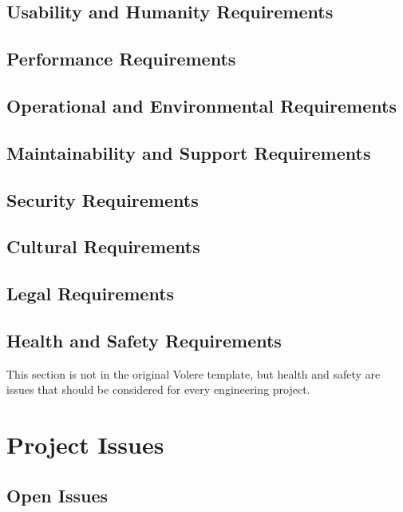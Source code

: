 \documentclass[12pt, titlepage]{article}
\begin{document}
    	\subsection{Usability and Humanity Requirements}

    	\subsection{Performance Requirements}

    	\subsection{Operational and Environmental Requirements}

    	\subsection{Maintainability and Support Requirements}

    	\subsection{Security Requirements}

    	\subsection{Cultural Requirements}

	    \subsection{Legal Requirements}

    	\subsection{Health and Safety Requirements}

    	This section is not in the original Volere template, but health and safety are
    	issues that should be considered for every engineering project.
	
	\newpage
    \section{Project Issues}

    	\subsection{Open Issues}
\end{document}

